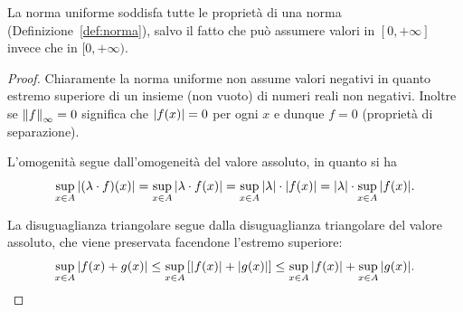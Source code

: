 \begin{theorem}
La norma uniforme soddisfa tutte le proprietà di una norma
(Definizione~\ref{def:norma}), salvo il fatto che può assumere valori in $[0,+\infty]$ invece che in $[0,+\infty)$.
\end{theorem}
%
\begin{proof}
Chiaramente la norma uniforme non assume valori negativi in quanto estremo superiore di un insieme (non vuoto) di numeri reali non negativi. Inoltre se ${\left\Vert f\right\Vert}_\infty=0$ significa che ${\left|f(x)\right|}=0$ per ogni $x$ e dunque $f=0$ (proprietà di separazione).

L'omogenità segue dall'omogeneità del valore assoluto, in quanto si ha
\[
  \sup_{x\in A} {\left|(\lambda \cdot f)(x)\right|}
  = \sup_{x\in A}{\left|\lambda \cdot f(x)\right|}
  = \sup_{x\in A}{\left|\lambda\right|}\cdot {\left|f(x)\right|}
  = {\left|\lambda\right|} \cdot \sup_{x\in A}{\left|f(x)\right|}.
\]

La disuguaglianza triangolare segue dalla disuguaglianza triangolare del valore assoluto, che viene preservata facendone l'estremo superiore:
\[
  \sup_{x\in A} {\left|f(x)+g(x)\right|}
  \le \sup_{x\in A} {\left[ {\left|f(x)\right|} + {\left|g(x)\right|} \right]}
  \le \sup_{x\in A} {\left|f(x)\right|} + \sup_{x\in A} {\left|g(x)\right|}.
\]
\end{proof}

